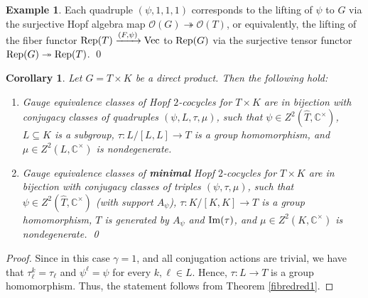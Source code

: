 \documentclass{amsart}
\newtheorem{corollary}[theorem]{Corollary}
\theoremstyle{definition}
\newtheorem{example}[theorem]{Example}
\newcommand{\Vect}{{\rm Vec}}
\renewcommand{\O}{\mathscr{O}}
\numberwithin{equation}{section}
\begin{document}
\begin{example}\label{partau1}
Each quadruple $(\psi,1,1,1)$ corresponds to the lifting of $\psi$ to $G$ via the surjective Hopf algebra map $\O(G)\twoheadrightarrow \O(T)$, or equivalently, the lifting of the fiber functor ${\rm Rep}(T)\xrightarrow{(F,\psi)} \Vect$ to ${\rm Rep}(G)$ via the surjective tensor functor ${\rm Rep}(G)\twoheadrightarrow {\rm Rep}(T)$. \qed
\end{example}

\begin{corollary}\label{directproductcase}
Let $G=T\times K$ be a direct product. Then the following hold:
\begin{enumerate}
\item
Gauge equivalence classes of Hopf $2$-cocycles for $T\times K$ are in bijection with conjugacy classes of quadruples $(\psi,L,\tau,\mu)$, such that $\psi\in Z^2(\widehat{T},\mathbb{C}^{\times})$, $L\subseteq K$ is a subgroup, $\tau:L/[L,L]\to T$ is a group homomorphism, and $\mu\in Z^2(L,\mathbb{C}^{\times})$ is nondegenerate.
\item
Gauge equivalence classes of {\bf minimal} Hopf $2$-cocycles for $T\times K$ are in bijection with conjugacy classes of triples $(\psi,\tau,\mu)$, such that $\psi\in Z^2(\widehat{T},\mathbb{C}^{\times})$ (with support $A_{\psi}$), $\tau:K/[K,K]\to T$ is a group homomorphism, $T$ is generated by $A_{\psi}$ and ${\rm Im}(\tau)$, and $\mu\in Z^2(K,\mathbb{C}^{\times})$ is nondegenerate. \qed
\end{enumerate}
\end{corollary}

\begin{proof}
Since in this case $\gamma=1$, and all conjugation actions are trivial, we have that $\tau_{\ell}^k=\tau_{\ell}$ and $\psi^{\ell}=\psi$ for every $k,\ell\in L$. Hence, $\tau:L\to T$ is a group homomorphism. Thus, the statement follows from Theorem \ref{fibredred1}.
\end{proof}
\end{document}

